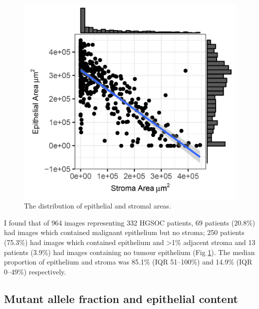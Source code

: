 \begin{figure}
    \centering
    \includegraphics{Chapter2/Figs/Raster/Montfort-2018_epi_stroma_dist.png}
    \caption{The distribution of epithelial and stromal areas.}
    \label{fig:distribution_infiltrate}
\end{figure}

I found that of 964 images representing 332 HGSOC patients, 69 patients (20.8\%) had images which contained malignant epithelium but no stroma; 250 patients (75.3\%) had images which contained epithelium and >1\% adjacent stroma and 13 patients (3.9\%) had images containing no tumour epithelium (Fig \ref{fig:distribution_infiltrate}). The median proportion of epithelium and stroma was 85.1\% (IQR 51–100\%) and 14.9\% (IQR 0–49\%) respectively.

\subsection{Mutant allele fraction and epithelial content}

